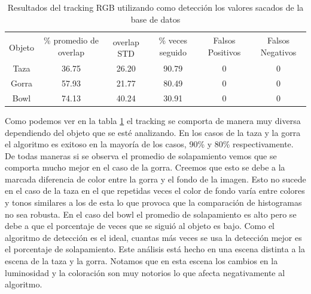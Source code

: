 \begin{table}[h]
    \begin{tabular}{|c|c|c|c|c|c|}
    \hline
    & \multirow{2}{2.4cm}{\% promedio de overlap} & & \multirow{2}{2cm}{\% veces seguido} & \multirow{2}{1.6cm}{Falsos Positivos} & \multirow{2}{1.6cm}{Falsos Negativos}\\
	Objeto & & overlap STD & & &\\
    \hline
    Taza   & 36.75      & 26.20       & 90.79             & 0                & 0\\
    \hline
    Gorra  & 57.93      & 21.77       & 80.49             & 0                & 0\\
    \hline
    Bowl   & 74.13      & 40.24       & 30.91             & 0                & 0\\
    \hline
    \end{tabular}
\caption{Resultados del tracking RGB utilizando como detección los valores sacados de la base de datos}
\label{tabla_rgb}
\end{table}

Como podemos ver en la tabla \ref{tabla_rgb} el tracking se comporta de manera muy diversa dependiendo del objeto que se esté analizando. En los casos de la taza y la gorra el algoritmo es exitoso en la mayoría de los casos, 90\% y 80\% respectivamente. De todas maneras si se observa el promedio de solapamiento vemos que se comporta mucho mejor en el caso de la gorra. Creemos que esto se debe a la marcada diferencia de color entre la gorra y el fondo de la imagen. Esto no sucede en el caso de la taza en el que repetidas veces el color de fondo varía entre colores y tonos similares a los de esta lo que provoca que la comparación de histogramas no sea robusta. En el caso del bowl el promedio de solapamiento es alto pero se debe a que el porcentaje de veces que se siguió al objeto es bajo. Como el algoritmo de detección es el ideal, cuantas más veces se usa la detección mejor es el porcentaje de solapamiento. Este análisis está hecho en una escena distinta a la escena de la taza y la gorra. Notamos que en esta escena los cambios en la luminosidad y la coloración son muy notorios lo que afecta negativamente al algoritmo.


